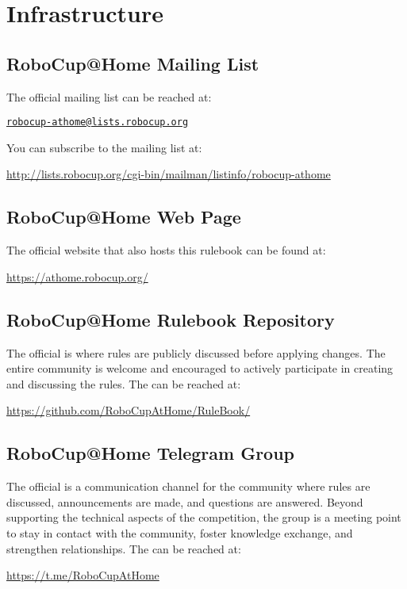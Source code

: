 \section{Infrastructure}
\label{sec:introduction:infrastructure}
\subsection{RoboCup@Home Mailing List}
\label{sec:introduction:mailinglist}
The official \AtHome{} mailing list can be reached at:
\begin{center}
\href{mailto:robocup-athome@lists.robocup.org}{\texttt{robocup-athome@lists.robocup.org}}
\end{center}
You can subscribe to the mailing list at:
\begin{center}
{\small\url{http://lists.robocup.org/cgi-bin/mailman/listinfo/robocup-athome}}
\end{center}

\subsection{RoboCup@Home Web Page}
\label{sec:introduction:webpage}
The official \AtHome{} website that also hosts this rulebook can be found at:
\begin{center}
{\small\url{https://athome.robocup.org/}}
\end{center}

\subsection{RoboCup@Home Rulebook Repository}
\label{sec:introduction:repo}
The official \AtHome{} \RR{} is where rules are publicly discussed before applying changes.
The entire \AtHome{} community is welcome and encouraged to actively participate in creating and discussing the rules. The \RR{} can be reached at:
\begin{center}
{\small\url{https://github.com/RoboCupAtHome/RuleBook/}}
\end{center}

\subsection{RoboCup@Home Telegram Group}
\label{sec:introduction:telegramgroup}
The official \AtHome{} \TG{} is a communication channel for the \AtHome{} community where rules are discussed, announcements are made, and questions are answered.
Beyond supporting the technical aspects of the competition, the group is a meeting point to stay in contact with the community, foster knowledge exchange, and strengthen relationships.
The \TG{} can be reached at:
\begin{center}
{\small\url{https://t.me/RoboCupAtHome}}
\end{center}

